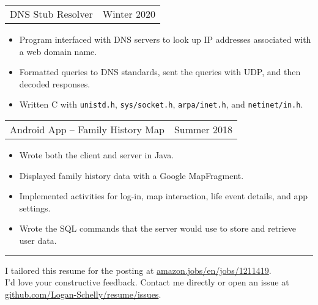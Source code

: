 \documentclass{article}
\newenvironment{compactItemize}{
  \begin{itemize}[itemsep=0ex, parsep=0ex, partopsep=0ex, topsep= -7pt]
}{
  \end{itemize}
}
\newcommand{\project}[2]{
  \begingroup
  \setlength{\tabcolsep}{0ex}
  \begin{tabularx}{\linewidth}{X r}
    #1 & %
    #2\\ %
  \end{tabularx}%
  \endgroup%
}
\begin{document}
\project{DNS Stub Resolver}{Winter 2020}
\begin{compactItemize}
  \item Program interfaced with DNS servers to look up IP addresses associated with a web domain name.
  \item Formatted queries to DNS standards, sent the queries with UDP, and then decoded responses.
  \item Written C with \texttt{unistd.h}, \texttt{sys/socket.h}, \texttt{arpa/inet.h}, and \texttt{netinet/in.h}.
\end{compactItemize}
\medskip

\project{Android App -- Family History Map}{Summer 2018}
\begin{compactItemize}
  \item Wrote both the client and server in Java.
  \item Displayed family history data with a Google MapFragment.
  \item Implemented activities for log-in, map interaction, life event details, and app settings.
  \item Wrote the SQL commands that the server would use to store and retrieve user data.
\end{compactItemize}
\bigskip
\hrule
\vfill
\begin{center}
  I tailored this resume for the posting at \href{https://www.amazon.jobs/en/jobs/1211419}{amazon.jobs/en/jobs/1211419}.\\
  I'd love your constructive feedback.  Contact me directly or open an issue at \href{https://github.com/Logan-Schelly/resume/issues}{github.com/Logan-Schelly/resume/issues}.
\end{center}
\end{document}
